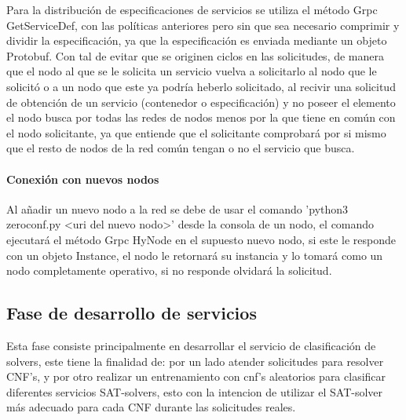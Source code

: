 \documentclass[11pt]{article}
\begin{document}
				Para la distribución de especificaciones de servicios se utiliza el método Grpc GetServiceDef, con las políticas anteriores pero sin que sea necesario comprimir y dividir la especificación, ya que
				la especificación es enviada mediante un objeto Protobuf.
				Con tal de evitar que se originen ciclos en las solicitudes, de manera que el nodo al que se le solicita un servicio vuelva a solicitarlo al nodo que le solicitó o a un nodo que este ya podría heberlo solicitado, al
				recivir una solicitud de obtención de un servicio (contenedor o especificación) y no poseer el elemento el nodo busca por todas las redes de nodos menos por la que tiene en común con el nodo
				solicitante, ya que entiende que el solicitante comprobará por si mismo que el resto de nodos de la red común tengan o no el servicio que busca. \\

			\paragraph{Conexión con nuevos nodos}
				Al añadir un nuevo nodo a la red se debe de usar el comando 'python3 zeroconf.py <uri del nuevo nodo>' desde la consola de un nodo, el comando ejecutará el método Grpc HyNode
				en el supuesto nuevo nodo, si este le responde con un objeto Instance, el nodo le retornará su instancia y lo tomará como un nodo completamente operativo, si no responde olvidará la solicitud. \\

				
		\subsection{Fase de desarrollo de servicios}
			Esta fase consiste principalmente en desarrollar el servicio de clasificación de solvers, este tiene la finalidad de: por un lado atender solicitudes para resolver CNF's, y por otro realizar un entrenamiento
			con cnf's aleatorios para clasificar diferentes servicios SAT-solvers, esto con la intencion de utilizar el SAT-solver más adecuado para cada CNF durante las solicitudes reales.
\end{document}
